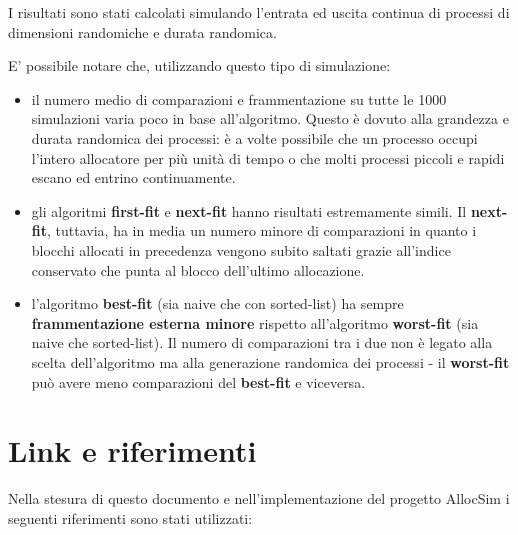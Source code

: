 \documentclass[12pt]{report}
\renewcommand\emph{\textbf}
\begin{document}
            I risultati sono stati calcolati simulando l'entrata ed uscita continua di processi di dimensioni randomiche e durata randomica.

            E' possibile notare che, utilizzando questo tipo di simulazione:

            \begin{itemize}
                \item il numero medio di comparazioni e frammentazione su tutte le 1000 simulazioni varia poco in base all'algoritmo. Questo è dovuto alla grandezza e durata randomica dei processi: è a volte possibile che un processo occupi l'intero allocatore per più unità di tempo o che molti processi piccoli e rapidi escano ed entrino continuamente.
                \item gli algoritmi \emph{first-fit} e \emph{next-fit} hanno risultati estremamente simili. Il \emph{next-fit}, tuttavia, ha in media un numero minore di comparazioni in quanto i blocchi allocati in precedenza vengono subito saltati grazie all'indice conservato che punta al blocco dell'ultimo allocazione.
                \item l'algoritmo \emph{best-fit} (sia naive che con sorted-list) ha sempre \emph{frammentazione esterna minore} rispetto all'algoritmo \emph{worst-fit} (sia naive che sorted-list). Il numero di comparazioni tra i due non è legato alla scelta dell'algoritmo ma alla generazione randomica dei processi - il \emph{worst-fit} può avere meno comparazioni del \emph{best-fit} e viceversa.
            \end{itemize}

        \section{Link e riferimenti}

            Nella stesura di questo documento e nell'implementazione del progetto AllocSim i seguenti riferimenti sono stati utilizzati:
\end{document}

